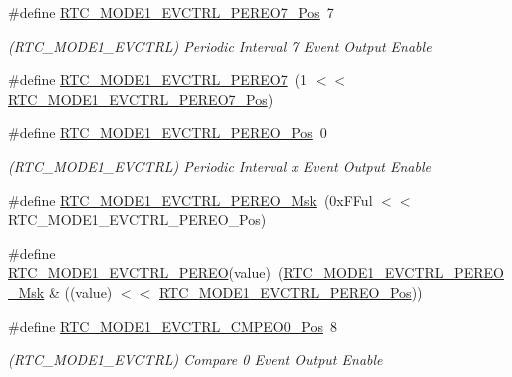 \begin{DoxyCompactItemize}
\#define \mbox{\hyperlink{group___s_a_m_d21___r_t_c_gaa41853206da7cff9a83448e7f4a83cb5}{R\+T\+C\+\_\+\+M\+O\+D\+E1\+\_\+\+E\+V\+C\+T\+R\+L\+\_\+\+P\+E\+R\+E\+O7\+\_\+\+Pos}}~7
\begin{DoxyCompactList}\small\item\em (R\+T\+C\+\_\+\+M\+O\+D\+E1\+\_\+\+E\+V\+C\+T\+RL) Periodic Interval 7 Event Output Enable \end{DoxyCompactList}\item 
\#define \mbox{\hyperlink{group___s_a_m_d21___r_t_c_ga19200f59b0805f3a6ca4a7301d6e22fb}{R\+T\+C\+\_\+\+M\+O\+D\+E1\+\_\+\+E\+V\+C\+T\+R\+L\+\_\+\+P\+E\+R\+E\+O7}}~(1 $<$$<$ \mbox{\hyperlink{group___s_a_m_d21___r_t_c_gaa41853206da7cff9a83448e7f4a83cb5}{R\+T\+C\+\_\+\+M\+O\+D\+E1\+\_\+\+E\+V\+C\+T\+R\+L\+\_\+\+P\+E\+R\+E\+O7\+\_\+\+Pos}})
\item 
\#define \mbox{\hyperlink{group___s_a_m_d21___r_t_c_gac494f12bde557de73ca2e699c34f591b}{R\+T\+C\+\_\+\+M\+O\+D\+E1\+\_\+\+E\+V\+C\+T\+R\+L\+\_\+\+P\+E\+R\+E\+O\+\_\+\+Pos}}~0
\begin{DoxyCompactList}\small\item\em (R\+T\+C\+\_\+\+M\+O\+D\+E1\+\_\+\+E\+V\+C\+T\+RL) Periodic Interval x Event Output Enable \end{DoxyCompactList}\item 
\#define \mbox{\hyperlink{group___s_a_m_d21___r_t_c_gafd9c31168ba419c3bcb57a8030980a7f}{R\+T\+C\+\_\+\+M\+O\+D\+E1\+\_\+\+E\+V\+C\+T\+R\+L\+\_\+\+P\+E\+R\+E\+O\+\_\+\+Msk}}~(0x\+F\+Ful $<$$<$ R\+T\+C\+\_\+\+M\+O\+D\+E1\+\_\+\+E\+V\+C\+T\+R\+L\+\_\+\+P\+E\+R\+E\+O\+\_\+\+Pos)
\item 
\#define \mbox{\hyperlink{group___s_a_m_d21___r_t_c_ga5ad3e2ed86885658547d84535e10e4fd}{R\+T\+C\+\_\+\+M\+O\+D\+E1\+\_\+\+E\+V\+C\+T\+R\+L\+\_\+\+P\+E\+R\+EO}}(value)~(\mbox{\hyperlink{group___s_a_m_d21___r_t_c_gafd9c31168ba419c3bcb57a8030980a7f}{R\+T\+C\+\_\+\+M\+O\+D\+E1\+\_\+\+E\+V\+C\+T\+R\+L\+\_\+\+P\+E\+R\+E\+O\+\_\+\+Msk}} \& ((value) $<$$<$ \mbox{\hyperlink{group___s_a_m_d21___r_t_c_gac494f12bde557de73ca2e699c34f591b}{R\+T\+C\+\_\+\+M\+O\+D\+E1\+\_\+\+E\+V\+C\+T\+R\+L\+\_\+\+P\+E\+R\+E\+O\+\_\+\+Pos}}))
\item 
\#define \mbox{\hyperlink{group___s_a_m_d21___r_t_c_ga37bab4782c298950d03ab4d937efa053}{R\+T\+C\+\_\+\+M\+O\+D\+E1\+\_\+\+E\+V\+C\+T\+R\+L\+\_\+\+C\+M\+P\+E\+O0\+\_\+\+Pos}}~8
\begin{DoxyCompactList}\small\item\em (R\+T\+C\+\_\+\+M\+O\+D\+E1\+\_\+\+E\+V\+C\+T\+RL) Compare 0 Event Output Enable \end{DoxyCompactList}\item 
$$
\end{DoxyCompactItemize}
